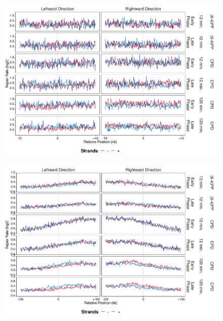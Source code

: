 \begin{figure}[H]
\begin{center}
\includegraphics[width=\textwidth]{Chapters/7_appendix/figures/supfig63}
\caption[]{}
\label{supfig:}
\end{center}
\end{figure}

\begin{figure}[H]
\begin{center}
\includegraphics[width=\textwidth]{Chapters/7_appendix/figures/supfig64}
\caption[]{}
\label{supfig:}
\end{center}
\end{figure}

